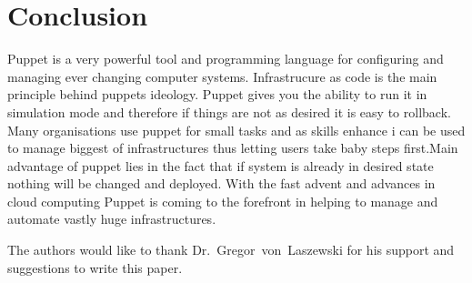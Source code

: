 \section{Conclusion}

Puppet is a very powerful tool and programming language for configuring and
managing ever changing computer systems. Infrastrucure as code is the main
principle behind puppets ideology. Puppet gives you the ability to run it in
simulation mode and therefore if things are not as desired it is easy to
rollback. Many organisations use puppet for small tasks and as skills enhance i
can be used to manage biggest of infrastructures thus letting users take baby
steps first.Main advantage of puppet lies in the fact that if system is already
in desired state nothing will be changed and deployed. With the fast advent and
advances in cloud computing Puppet is coming to the forefront in helping to
manage and automate vastly huge infrastructures.

\begin{acks}

  The authors would like to thank Dr.~Gregor~von~Laszewski for his support and
  suggestions to write this paper.

\end{acks}

 

